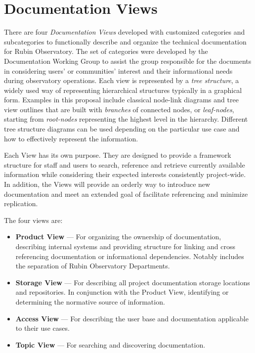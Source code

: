 \section{Documentation Views}
\label{sec:views}

There are four \emph{Documentation Views} developed with customized categories and subcategories to functionally describe and organize the technical documentation for Rubin Observatory.
The set of categories were developed by the Documentation Working Group to assist the group responsible for the documents in considering users' or communities' interest and their informational needs during observatory operations.
Each view is represented by a \emph{tree structure}, a widely used way of representing hierarchical structures typically in a graphical form.
Examples in this proposal include classical node-link diagrams and tree view outlines that are built with \emph{branches} of connected nodes, or \emph{leaf-nodes}, starting from \emph{root-nodes} representing the highest level in the hierarchy.
Different tree structure diagrams can be used depending on the particular use case and how to effectively represent the information.
\citep{wiki-tree-diagram-cite}

Each View has its own purpose.
They are designed to provide a framework structure for staff and users to search, reference and retrieve currently available information while considering their expected interests consistently project-wide.
In addition, the Views will provide an orderly way to introduce new documentation and meet an extended goal of facilitate referencing and minimize replication.

The four views are:

\begin{itemize}

  \item \textbf{Product View} --- For organizing the ownership of documentation, describing internal systems and providing structure for linking and cross referencing documentation or informational dependencies.
  Notably includes the separation of Rubin Observatory Departments.

  \item \textbf{Storage View} --- For describing all project documentation storage locations and repositories.
  In conjunction with the Product View, identifying or determining the normative source of information.

  \item \textbf{Access View} --- For describing the user base and documentation applicable to their use cases.

  \item \textbf{Topic View} --- For searching and discovering documentation.

\end{itemize}

